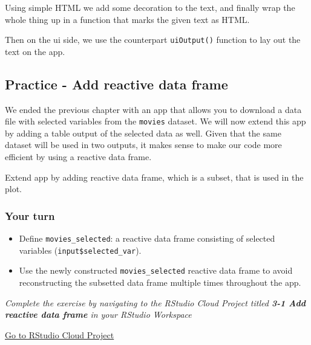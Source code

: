 \documentclass[
  letterpaper,
  DIV=11,
  numbers=noendperiod]{scrreprt}
\providecommand{\tightlist}{%
  \setlength{\itemsep}{0pt}\setlength{\parskip}{0pt}}
\begin{document}
Using simple HTML we add some decoration to the text, and finally wrap
the whole thing up in a function that marks the given text as HTML.

Then on the ui side, we use the counterpart \texttt{uiOutput()} function
to lay out the text on the app.

\hypertarget{practice---add-reactive-data-frame}{%
\subsection{Practice - Add reactive data
frame}\label{practice---add-reactive-data-frame}}

We ended the previous chapter with an app that allows you to download a
data file with selected variables from the \texttt{movies} dataset. We
will now extend this app by adding a table output of the selected data
as well. Given that the same dataset will be used in two outputs, it
makes sense to make our code more efficient by using a reactive data
frame.

Extend app by adding reactive data frame, which is a subset, that is
used in the plot.

\hypertarget{your-turn-20}{%
\subsubsection{Your turn}\label{your-turn-20}}

\begin{itemize}
\tightlist
\item
  Define \texttt{movies\_selected}: a reactive data frame consisting of
  selected variables (\texttt{input\$selected\_var}).
\item
  Use the newly constructed \texttt{movies\_selected} reactive data
  frame to avoid reconstructing the subsetted data frame multiple times
  throughout the app.
\end{itemize}

\emph{Complete the exercise by navigating to the RStudio Cloud Project
titled \textbf{3-1 Add reactive data frame} in your RStudio Workspace}

\href{https://rstudio.cloud/spaces/81721/join?access_code=I4VJaNsKfTqR3Td9hLP7E1nz8\%2FtMg6Xbw9Bgqumv}{
Go to RStudio Cloud Project}
\end{document}
